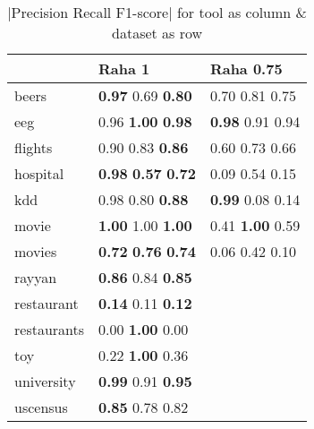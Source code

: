 \begin{table}
\centering
\caption{|Precision Recall F1-score| for tool as column \& dataset as row}
\begin{tabular}{lll}
\toprule
{} &                                      Raha 1 &                   Raha 0.75 \\
\midrule
beers       &          \textbf{0.97} 0.69  \textbf{0.80}  &          0.70  0.81  0.75   \\
eeg         &          0.96  \textbf{1.00} \textbf{0.98}  &  \textbf{0.98} 0.91  0.94   \\
flights     &                  0.90  0.83  \textbf{0.86}  &          0.60  0.73  0.66   \\
hospital    &  \textbf{0.98} \textbf{0.57} \textbf{0.72}  &          0.09  0.54  0.15   \\
kdd         &                  0.98  0.80  \textbf{0.88}  &  \textbf{0.99} 0.08  0.14   \\
movie       &          \textbf{1.00} 1.00  \textbf{1.00}  &  0.41  \textbf{1.00} 0.59   \\
movies      &  \textbf{0.72} \textbf{0.76} \textbf{0.74}  &          0.06  0.42  0.10   \\
rayyan      &          \textbf{0.86} 0.84  \textbf{0.85}  &                             \\
restaurant  &          \textbf{0.14} 0.11  \textbf{0.12}  &                             \\
restaurants &                  0.00  \textbf{1.00} 0.00   &                             \\
toy         &                  0.22  \textbf{1.00} 0.36   &                             \\
university  &          \textbf{0.99} 0.91  \textbf{0.95}  &                             \\
uscensus    &                  \textbf{0.85} 0.78  0.82   &                             \\
\bottomrule
\end{tabular}
\end{table}
